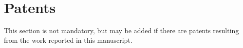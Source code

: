 \documentclass[journal,article,submit,pdftex,moreauthors]{Definitions/mdpi}
\begin{document}
\section{Patents}

This section is not mandatory, but may be added if there are patents resulting from the work reported in this manuscript.

\vspace{6pt} 




\end{document}
